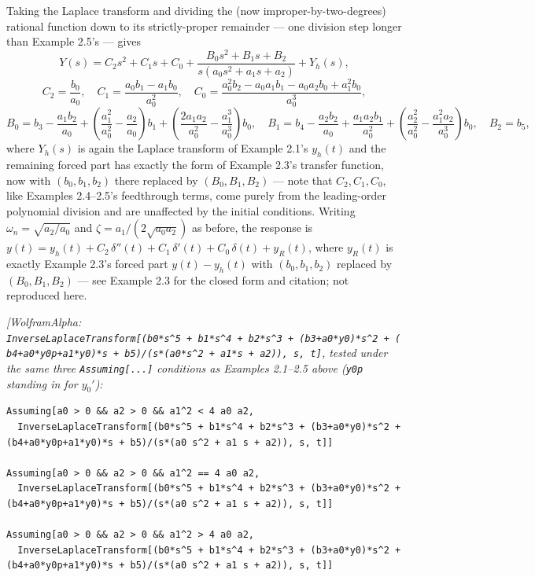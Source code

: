 \documentclass[
  11pt,
]{article}
\begin{document}
Taking the Laplace transform and dividing the (now
improper-by-two-degrees) rational function down to its strictly-proper
remainder --- one division step longer than Example 2.5's --- gives \[
Y(s) = C_2 s^2 + C_1 s + C_0 + \frac{B_0 s^2 + B_1 s + B_2}{s(a_0 s^2+a_1 s+a_2)} + Y_h(s),
\] \[
C_2 = \frac{b_0}{a_0}, \quad C_1 = \frac{a_0 b_1 - a_1 b_0}{a_0^2}, \quad C_0 = \frac{a_0^2 b_2 - a_0 a_1 b_1 - a_0 a_2 b_0 + a_1^2 b_0}{a_0^3},
\] \[
B_0 = b_3 - \frac{a_1 b_2}{a_0} + \left(\frac{a_1^2}{a_0^2}-\frac{a_2}{a_0}\right) b_1 + \left(\frac{2a_1a_2}{a_0^2}-\frac{a_1^3}{a_0^3}\right) b_0, \quad B_1 = b_4 - \frac{a_2 b_2}{a_0} + \frac{a_1a_2 b_1}{a_0^2} + \left(\frac{a_2^2}{a_0^2}-\frac{a_1^2a_2}{a_0^3}\right) b_0, \quad B_2 = b_5,
\] where \(Y_h(s)\) is again the Laplace transform of Example 2.1's
\(y_h(t)\) and the remaining forced part has exactly the form of Example
2.3's transfer function, now with \((b_0,b_1,b_2)\) there replaced by
\((B_0,B_1,B_2)\) --- note that \(C_2,C_1,C_0\), like Examples
2.4--2.5's feedthrough terms, come purely from the leading-order
polynomial division and are unaffected by the initial conditions.
Writing \(\omega_n=\sqrt{a_2/a_0}\) and \(\zeta=a_1/(2\sqrt{a_0a_2})\)
as before, the response is
\(y(t) = y_h(t) + C_2\,\delta''(t) + C_1\,\delta'(t) + C_0\,\delta(t) + y_R(t)\),
where \(y_R(t)\) is exactly Example 2.3's forced part \(y(t)-y_h(t)\)
with \((b_0,b_1,b_2)\) replaced by \((B_0,B_1,B_2)\) --- see Example 2.3
for the closed form and citation; not reproduced here.

\emph{{[}WolframAlpha:
\texttt{InverseLaplaceTransform{[}(b0*s\^{}5\ +\ b1*s\^{}4\ +\ b2*s\^{}3\ +\ (b3+a0*y0)*s\^{}2\ +\ (b4+a0*y0p+a1*y0)*s\ +\ b5)/(s*(a0*s\^{}2\ +\ a1*s\ +\ a2)),\ s,\ t{]}},
tested under the same three \texttt{Assuming{[}...{]}} conditions as
Examples 2.1--2.5 above (\texttt{y0p} standing in for \(y_0'\)):}

\begin{verbatim}
Assuming[a0 > 0 && a2 > 0 && a1^2 < 4 a0 a2,
  InverseLaplaceTransform[(b0*s^5 + b1*s^4 + b2*s^3 + (b3+a0*y0)*s^2 + (b4+a0*y0p+a1*y0)*s + b5)/(s*(a0 s^2 + a1 s + a2)), s, t]]

Assuming[a0 > 0 && a2 > 0 && a1^2 == 4 a0 a2,
  InverseLaplaceTransform[(b0*s^5 + b1*s^4 + b2*s^3 + (b3+a0*y0)*s^2 + (b4+a0*y0p+a1*y0)*s + b5)/(s*(a0 s^2 + a1 s + a2)), s, t]]

Assuming[a0 > 0 && a2 > 0 && a1^2 > 4 a0 a2,
  InverseLaplaceTransform[(b0*s^5 + b1*s^4 + b2*s^3 + (b3+a0*y0)*s^2 + (b4+a0*y0p+a1*y0)*s + b5)/(s*(a0 s^2 + a1 s + a2)), s, t]]
\end{verbatim}
\end{document}
